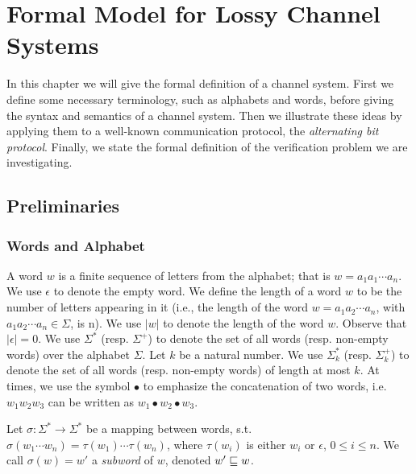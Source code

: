 \section{Formal Model for Lossy Channel Systems}
\label{definitions}
In this chapter we will give the formal definition of a channel system. First we define some necessary terminology, such as alphabets and words, before giving the syntax and semantics of a channel system. Then we illustrate these ideas by applying them to a well-known communication protocol, the \emph{alternating bit protocol}. Finally, we state the formal definition of the verification problem we are investigating.

\subsection{Preliminaries}
\subsubsection{Words and Alphabet}
A word  $w$ is a finite sequence of letters  from the alphabet; that is $ w=a_1 a_1 \cdots a_n$. We use $\epsilon$  to denote the empty word. We define the length  of a word $w$ to be the number of letters appearing in it (i.e., the length of the word $w=a_1 a_2 \cdots a_n$, with $a_1 a_2 \cdots a_n\in \Sigma$, is n). We use $|w|$ to denote the length of the word $w$. Observe that $|\epsilon|=0$. We use $\Sigma^*$  (resp. $\Sigma^+$) to denote the set of all  words (resp. non-empty words) over the alphabet $\Sigma$.  Let $k$ be a natural number.  We use $\Sigma_k^*$  (resp. $\Sigma_k^+$) to denote the set of all  words (resp. non-empty words)  of length at most $k$. At times, we use the symbol $\bullet$ to emphasize the concatenation of two words, i.e. $w_1w_2w_3$ can be written as $w_1 \bullet w_2 \bullet w_3$.


Let $\sigma : \Sigma^* \rightarrow \Sigma^*$ be a mapping between words, s.t. $\sigma(w_1\cdots w_n) = \tau(w_1)\cdots \tau(w_n)$, where $\tau(w_i)$ is either $w_i$ or $\epsilon$, $0 \leq i \leq n$. We call $\sigma(w) = w'$ a \emph{subword} of $w$, denoted $w' \sqsubseteq w$.

